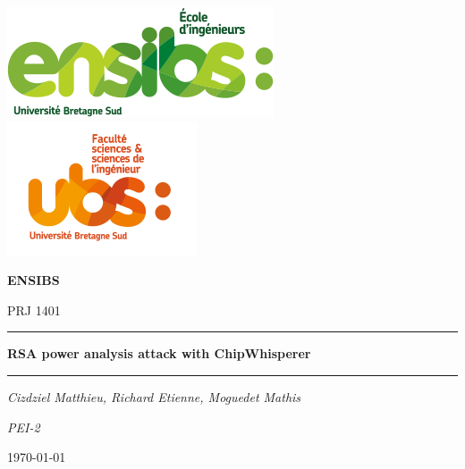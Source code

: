 \documentclass[a4paper,12pt]{article}
\begin{document}
\begin{titlepage}
  \vspace*{-2cm}
  \hspace*{-2cm}\includegraphics[scale=0.6]{logo.png}
  \vspace*{-2cm}
  \hspace*{7cm}\includegraphics[scale=0.6]{logo2.png}\par
  \vspace{4cm}
  \centering
  {\scshape\LARGE \textbf{ENSIBS} \par}

  \vspace{1cm}
  {\scshape\Large PRJ 1401 \par}
  \vspace{1cm}
  \rule{\linewidth}{0.4mm}\par %
  \vspace{1cm}
  {\huge\bfseries RSA power analysis attack with ChipWhisperer \par}
  \vspace{1cm}
  \rule{\linewidth}{0.4mm}\par %
  \par
  \vspace{1cm}
  {\Large\itshape Cizdziel Matthieu, Richard Etienne, Moguedet Mathis\par}
  \vspace{1cm}
  {\Large\itshape PEI-2\par}
  \vspace{3cm}
  \par
  \vfill
  {\large \today\par}
\end{titlepage}
\end{document}
